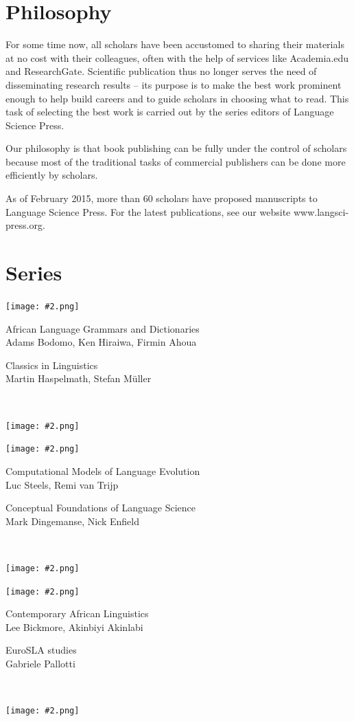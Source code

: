 \documentclass[
notumble,
]{leaflet}
\begin{document}
 \section{\sffamily\Large Philosophy}
 \parbox{\textwidth}{
 For some time now, all scholars have been accustomed to sharing their materials at no cost with their colleagues, often with the help of services like Academia.edu and ResearchGate. Scientific publication thus no longer serves the need of disseminating research results -- its purpose is to make the best work prominent enough to help build careers and to guide scholars in choosing what to read. This task of selecting the best work is carried out by the series editors of Language Science Press.

 Our philosophy is that book publishing can be fully under the control of scholars because most of the traditional tasks of commercial publishers can be done more efficiently by scholars. 
 
As of February 2015, more than 60 scholars have proposed manuscripts to Language Science Press. For the latest publications, see our website www.langsci-press.org.
 }
\newpage 

\section{\sffamily\Large Series}

\newcommand{\leftseries}[3]{   
    \parbox{64mm}{\raggedleft\footnotesize #1\\{\scriptsize #3}}
    \parbox{1mm}{~}
    \parbox{6mm}{\texttt{[image: \#2.png]}} 
}

\newcommand{\rightseries}[3]{   
    \parbox{6mm}{\texttt{[image: \#2.png]}}
    \parbox{64mm}{\raggedright\footnotesize #1\\{\scriptsize #3}}    
}

\rightseries{African Language Grammars and Dictionaries}{algad}{Adams Bodomo, Ken Hiraiwa, Firmin Ahoua}
\leftseries{Classics in Linguistics}{classics}{Martin Haspelmath, Stefan Müller}

\rightseries{Computational Models of Language Evolution}{cmle}{Luc Steels, Remi van Trijp}
\leftseries{Conceptual Foundations of Language Science}{cfls}{Mark Dingemanse, Nick Enfield}

\rightseries{Contemporary African Linguistics}{cal}{Lee Bickmore, Akinbiyi Akinlabi}
\leftseries{EuroSLA studies}{eurosla}{Gabriele Pallotti}
\end{document}
